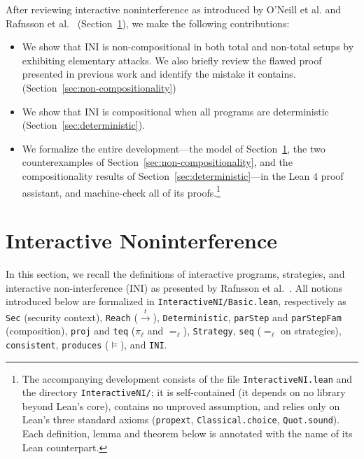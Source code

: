 \documentclass[preprint,5p,twocolumn]{elsarticle}
\begin{document}
After reviewing interactive noninterference as introduced by O'Neill et al. and Rafnsson et al.~\cite{ONeill2006,Rafnsson2012}
(Section~\ref{sec:preliminaries}), we make the following contributions:
\begin{itemize}
\item We show that INI is non-compositional in both total and non-total setups by exhibiting elementary
  attacks. We also briefly review the flawed proof presented in previous work and identify the mistake it contains.
  (Section~\ref{sec:non-compositionality})
\item We show that INI is compositional when all programs are deterministic (Section~\ref{sec:deterministic}).
\item We formalize the entire development---the model of Section~\ref{sec:preliminaries}, the two
  counterexamples of Section~\ref{sec:non-compositionality}, and the compositionality results of
  Section~\ref{sec:deterministic}---in the Lean 4 proof assistant, and machine-check all of its
  proofs.\footnote{The accompanying development consists of the file \texttt{InteractiveNI.lean} and
  the directory \texttt{InteractiveNI/}; it is self-contained (it depends on no library beyond Lean's
  core), contains no unproved assumption, and relies only on Lean's three standard axioms
  (\texttt{propext}, \texttt{Classical.choice}, \texttt{Quot.sound}). Each definition, lemma and
  theorem below is annotated with the name of its Lean counterpart.}
\end{itemize}

\section{Interactive Noninterference}

\label{sec:preliminaries}

\newcommand{\Strat}{\mathbf{Strat}}
\newcommand{\StratT}{\mathbf{Strat}_{\mathrm{T}}}
\newcommand{\StratNI}{\mathbf{Strat}\text{-}\mathrm{NI}}
\newcommand{\StratTNI}{\mathbf{Strat}_{\mathrm{T}}\text{-}\mathrm{NI}}
\newcommand{\States}{\mathbb{S}}
\newcommand{\IO}{\mathrm{IO}}
\newcommand{\Channels}{\mathbb{C}}
\newcommand{\Values}{\mathbb{V}}
\newcommand{\Traces}{\mathbb{T}}

In this section, we recall the definitions of interactive programs, strategies, and interactive non-interference (INI) as presented by Rafnsson et al.~\cite{Rafnsson2012}. All notions introduced below are formalized in \texttt{InteractiveNI/Basic.lean}, respectively as \texttt{Sec} (security context), \texttt{Reach} ($\xrightarrow{t}$), \texttt{Deterministic}, \texttt{parStep} and \texttt{parStepFam} (composition), \texttt{proj} and \texttt{teq} ($\pi_\ell$ and $=_\ell$), \texttt{Strategy}, \texttt{seq} ($=_\ell$ on strategies), \texttt{consistent}, \texttt{produces} ($\vDash$), and \texttt{INI}.
\end{document}
